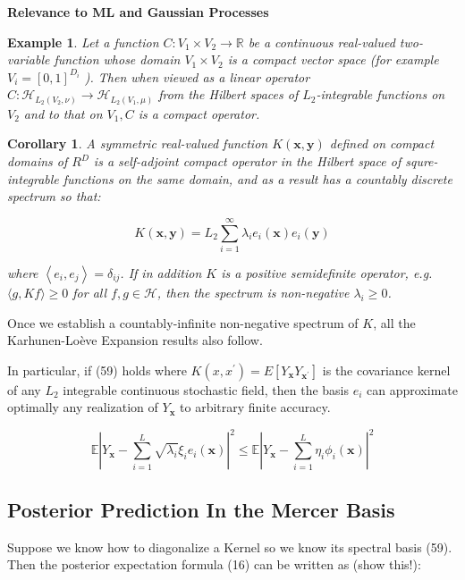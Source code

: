 \documentclass[11pt]{article}
\theoremstyle{plain} %
\newtheorem{corollary}[theorem]{Corollary}
\newtheorem{example}[theorem]{Example}
\theoremstyle{remark}
\begin{document}
\textbf{Relevance to ML and Gaussian Processes}

\begin{example}
Let a function $C: V_{1} \times V_{2} \rightarrow \mathbb{R}$ be a continuous
real-valued two-variable function whose domain $V_{1} \times V_{2}$ is a compact
vector space (for example $V_{i}=[0,1]^{D_{i}}$ ). Then when viewed as a linear
operator $C: \mathcal{H}_{L_{2}\left(V_{2}, \nu\right)} \rightarrow
  \mathcal{H}_{L_{2}\left(V_{1}, \mu\right)}$ from the Hilbert spaces of
$L_{2}$-integrable functions on $V_{2}$ and to that on $V_{1}, C$ is a compact
operator.
\end{example}

\begin{corollary}
  A symmetric real-valued function $K(\mathbf{x}, \mathbf{y})$ defined on compact
domains of $R^{D}$ is a self-adjoint compact operator in the Hilbert space of
squre-integrable functions on the same domain, and as a result has a countably
discrete spectrum so that:

$$
  K(\mathbf{x}, \mathbf{y})=L_{2} \sum_{i=1}^{\infty} \lambda_{i} e_{i}(\mathbf{x}) e_{i}(\mathbf{y})
$$

where $\left\langle e_{i}, e_{j}\right\rangle=\delta_{i j}$. If in addition $K$
is a positive semidefinite operator, e.g. $\langle g, K f\rangle \geq 0$ for all
$f, g \in \mathcal{H}$, then the spectrum is non-negative $\lambda_{i} \geq 0$.
\end{corollary}

Once we establish a countably-infinite non-negative spectrum of $K$, all the
Karhunen-Loève Expansion results also follow.

In particular, if (59) holds where $K\left(x,
  x^{\prime}\right)=E\left[Y_{\mathbf{x}} Y_{\mathbf{x}^{\prime}}\right]$ is the covariance
kernel of any $L_{2}$ integrable continuous stochastic field, then the basis
$e_{i}$ can approximate optimally any realization of $Y_{\mathbf{x}}$ to
arbitrary finite accuracy.

$$
  \mathbb{E}\left|Y_{\mathbf{x}}-\sum_{i=1}^{L} \sqrt{\lambda_{i}} \xi_{i} e_{i}(\mathbf{x})\right|^{2} \leq \mathbb{E}\left|Y_{\mathbf{x}}-\sum_{i=1}^{L} \eta_{i} \phi_{i}(\mathbf{x})\right|^{2}
$$

\subsection{Posterior Prediction In the Mercer Basis}
Suppose we know how to diagonalize a Kernel so we know its spectral basis (59).
Then the posterior expectation formula (16) can be written as (show this!):
\end{document}
